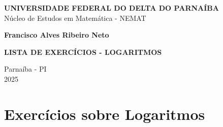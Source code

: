 \documentclass[12pt,a4paper]{article}
\begin{document}
\begin{titlepage}
  \begin{center}
    \onehalfspacing

    \textbf{UNIVERSIDADE FEDERAL DO DELTA DO PARNAÍBA} \\
    Núcleo de Estudos em Matemática - NEMAT

    \vspace{4cm}
    \textbf{Francisco Alves Ribeiro Neto}

    \vspace{4cm}
    \textbf{\LARGE LISTA DE EXERCÍCIOS - LOGARITMOS}

    \vfill
    Parnaíba - PI \\
    2025
  \end{center}
\end{titlepage}

\onehalfspacing
\section*{Exercícios sobre Logaritmos}
\end{document}

